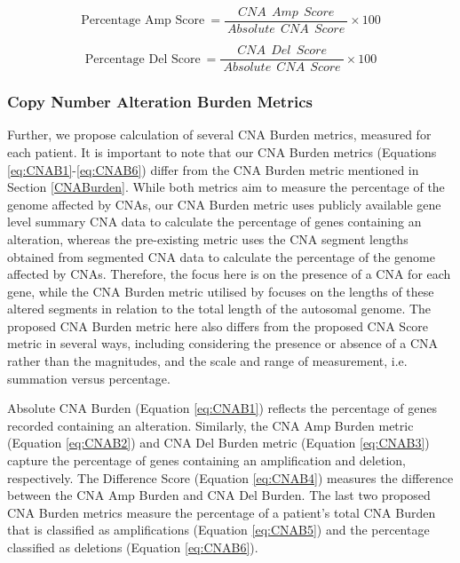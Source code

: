\begin{equation}
\text{Percentage Amp Score}\: = \frac{\:CNA\:\:Amp\:\:Score\:}{\:Absolute\:\:CNA\:\:Score\:}\times100
\label{eq:CNA5}
\end{equation}

\begin{equation}
\text{Percentage Del Score}\: = \frac{\:CNA\:\:Del\:\:Score\:}{\:Absolute\:\:CNA\:\:Score\:}\times100
\label{eq:CNA6}
\end{equation}

\subsubsection{Copy Number Alteration Burden Metrics}
Further, we propose calculation of several CNA Burden metrics, measured for each patient. It is important to note that our CNA Burden metrics (Equations \ref{eq:CNAB1}-\ref{eq:CNAB6}) differ from the CNA Burden metric \citep{pmid25024180} mentioned in Section \ref{CNABurden}. While both metrics aim to measure the percentage of the genome affected by CNAs, our CNA Burden metric uses publicly available gene level summary CNA data to calculate the percentage of genes containing an alteration, whereas the pre-existing metric uses the CNA segment lengths obtained from segmented CNA data to calculate the percentage of the genome affected by CNAs. Therefore, the focus here is on the presence of a CNA for each gene, while the CNA Burden metric utilised by \cite{pmid25024180} focuses on the lengths of these altered segments in relation to the total length of the autosomal genome. The proposed CNA Burden metric here also differs from the proposed CNA Score metric in several ways, including considering the presence or absence of a CNA rather than the magnitudes, and the scale and range of measurement, i.e. summation versus percentage.   

Absolute CNA Burden (Equation \ref{eq:CNAB1}) reflects the percentage of genes recorded containing an alteration. Similarly, the CNA Amp Burden metric (Equation \ref{eq:CNAB2}) and CNA Del Burden metric (Equation \ref{eq:CNAB3}) capture the percentage of genes containing an amplification and deletion, respectively. The Difference Score (Equation \ref{eq:CNAB4}) measures the difference between the CNA Amp Burden and CNA Del Burden. The last two proposed CNA Burden metrics measure the percentage of a patient's total CNA Burden that is classified as amplifications (Equation \ref{eq:CNAB5}) and the percentage classified as deletions (Equation \ref{eq:CNAB6}).

